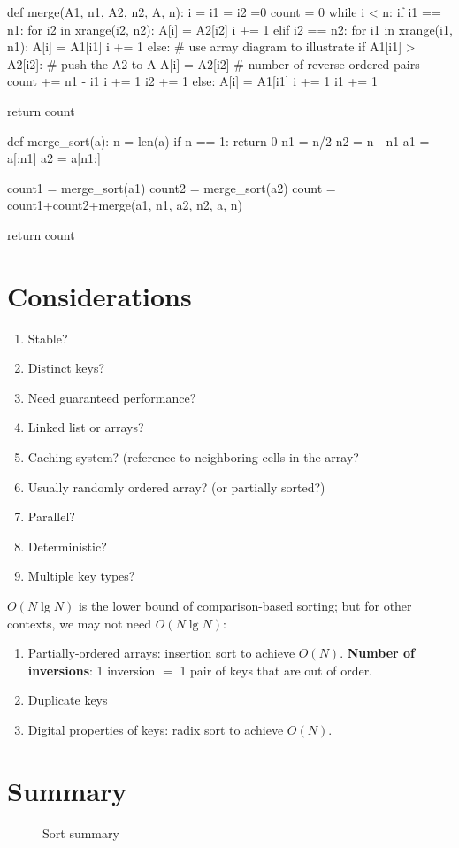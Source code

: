\begin{python}
def merge(A1, n1, A2, n2, A, n):
    i = i1 = i2 =0
    count = 0
    while i < n:
        if i1 == n1:
            for i2 in xrange(i2, n2):
                A[i] = A2[i2]
                i += 1
        elif i2 == n2:
            for i1 in xrange(i1, n1):
                A[i] = A1[i1]
                i += 1
        else:
            # use array diagram to illustrate
            if A1[i1] > A2[i2]:  # push the A2 to A
                A[i] = A2[i2]
                # number of reverse-ordered pairs
                count += n1 - i1
                i += 1
                i2 += 1
            else:
                A[i] = A1[i1]
                i += 1
                i1 += 1

    return count

def merge_sort(a):
    n = len(a)
    if n == 1:
        return 0
    n1 = n/2
    n2 = n - n1
    a1 = a[:n1]
    a2 = a[n1:]

    count1 = merge_sort(a1)
    count2 = merge_sort(a2)
    count = count1+count2+merge(a1, n1, a2, n2, a, n)

    return count
\end{python}



\section{Considerations}
\begin{enumerate}
\item Stable?
\item Distinct keys?
\item Need guaranteed performance?
\item Linked list or arrays?
\item Caching system? (reference to neighboring cells in the array? 
\item Usually randomly ordered array?
(or partially sorted?)\item Parallel?
\item Deterministic?
\item Multiple key types?
\end{enumerate}

$O(N\lg N)$ is the lower bound of comparison-based sorting; but for other
contexts, we may not need $O(N \lg N)$:
\begin{enumerate}
\item Partially-ordered arrays: insertion sort to achieve $O(N)$. \textbf{Number of inversions}: 1 inversion $=$ 1 pair of keys that are out
of order.
\item Duplicate keys
\item Digital properties of keys: radix sort to achieve $O(N)$.
\end{enumerate}

\section{Summary}
\begin{figure}[hbtp]
\centering
{}
\caption{Sort summary}
\label{fig:trie} 
\end{figure}
